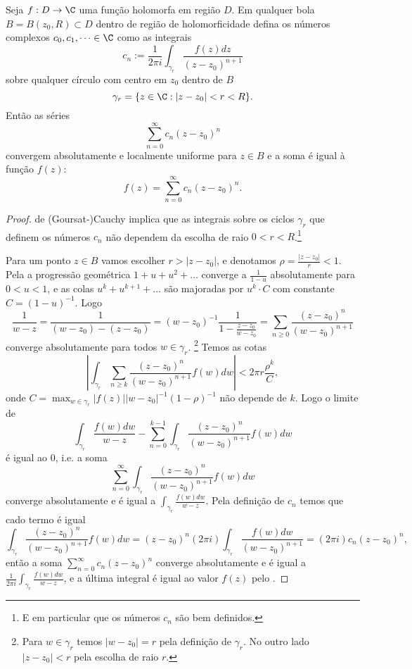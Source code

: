 \begin{teorema}
\label{t:hol-series}
Seja $f : D \to \C$ uma função holomorfa em região $D$.
Em qualquer bola $B = B(z_0,R) \subset D$ dentro de região de holomorficidade
defina os números complexos $c_0,c_1,\dots\in\C$ como as integrais
\begin{equation}
 c_n := \frac1{2\pi i} \int_{\gamma_r} \frac{f(z)dz}{(z-z_0)^{n+1}} 
\end{equation}
sobre qualquer círculo com centro em $z_0$ dentro de $B$  
\[ \gamma_r = \{ z\in \C : |z-z_0|< r < R \}. \]
Então as séries
\[ \sum_{n=0}^\infty c_n (z-z_0)^n \]
convergem absolutamente e localmente uniforme para $z\in B$
e a soma é igual à função $f(z)$:
\[ f(z) = \sum_{n=0}^\infty c_n (z-z_0)^n. \]
\end{teorema}
\begin{proof}
 de (Goursat-)Cauchy implica que as integrais sobre os ciclos $\gamma_r$
que definem os números $c_n$
não dependem da escolha de raio $0<r<R$.\footnote{E em particular que os números $c_n$ são bem definidos.}

Para um ponto $z\in B$ vamos escolher $r > |z-z_0|$, e denotamos $\rho = \frac{|z-z_0|}{r} < 1$.
Pela 
a progressão geométrica $1 + u + u^2 + \dots$ converge a $\frac{1}{1-u}$ absolutamente para $0<u<1$,
e as colas $u^k + u^{k+1} + \dots$ são majoradas por $u^k \cdot C$ com constante $C = (1-u)^{-1}$.
Logo 
\begin{equation}
\label{eq:series-geometrica}
 \frac{1}{w-z} = \frac{1}{(w-z_0)-(z-z_0)} = (w-z_0)^{-1} \frac1{1-\frac{z-z_0}{w-z_0}}
= \sum_{n\geq 0} \frac{(z-z_0)^n}{(w-z_0)^{n+1}}
\end{equation}
converge absolutamente para todos $w\in\gamma_r$.
\footnote{Para $w\in \gamma_r$ temos $|w-z_0| = r$ pela definição de $\gamma_r$.
No outro lado $|z-z_0|<r$ pela escolha de raio $r$.}
Temos as cotas
\[ |\int_{\gamma_r} \sum_{n\geq k} \frac{(z-z_0)^n}{(w-z_0)^{n+1}} f(w) dw|
< 2\pi r \frac{\rho^k} C, \]
onde $C = \max_{w\in\gamma_r} |f(z)| |w-z_0|^{-1} (1-\rho)^{-1}$ não depende de $k$.
Logo o limite de
\[ \int_{\gamma_r} \frac{f(w)dw}{w-z} - \sum_{n=0}^{k-1} \int_{\gamma_r} \frac{(z-z_0)^n}{(w-z_0)^{n+1}} f(w) dw \]
é igual ao $0$, i.e. a soma
\[ \sum_{n=0}^\infty \int_{\gamma_r} \frac{(z-z_0)^n}{(w-z_0)^{n+1}} f(w) dw \]
converge absolutamente e é igual a $\int_{\gamma_r} \frac{f(w)dw}{w-z}$.
Pela definição de $c_n$ temos que cado termo é igual
\[ \int_{\gamma_r} \frac{(z-z_0)^n}{(w-z_0)^{n+1}} f(w) dw 
= (z-z_0)^n (2\pi i) \int_{\gamma_r} \frac{f(w)dw}{(w-z_0)^{n+1}}
= (2\pi i) c_n (z-z_0)^n, \]
então a soma $\sum_{n=0}^\infty c_n (z-z_0)^n$ converge absolutamente
e é igual a $\frac{1}{2\pi i} \int_{\gamma_r} \frac{f(w)dw}{w-z}$,
e a última integral é igual ao valor $f(z)$ pelo .
\end{proof}

